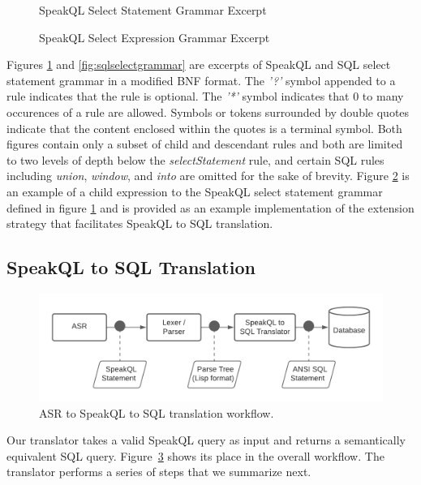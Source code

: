 \begin{figure}[H]
\selectStatementTable
\caption{SpeakQL Select Statement Grammar Excerpt}
\label{fig:speakqlselectgrammar}
\end{figure}

\begin{figure}[H]
\selectExpressionTable
\caption{SpeakQL Select Expression Grammar Excerpt}
\label{fig:selectexprgrammar}
\end{figure}

Figures \ref{fig:speakqlselectgrammar} and \ref{fig:sqlselectgrammar} are excerpts of SpeakQL and SQL select statement grammar in a modified BNF format. The \emph{'?'} symbol appended to a rule indicates that the rule is optional. The \emph{'*'} symbol indicates that 0 to many occurences of a rule are allowed. Symbols or tokens surrounded by double quotes indicate that the content enclosed within the quotes is a terminal symbol. Both figures contain only a subset of child and descendant rules and both are limited to two levels of depth below the \emph{selectStatement} rule, and certain SQL rules including \emph{union}, \emph{window}, and \emph{into} are omitted for the sake of brevity. Figure \ref{fig:selectexprgrammar} is an example of a child expression to the SpeakQL select statement grammar defined in figure \ref{fig:speakqlselectgrammar} and is provided as an example implementation of the extension strategy that facilitates SpeakQL to SQL translation.


\subsection{SpeakQL to SQL Translation}

\begin{figure}[h]
  \centering
  \includegraphics[width=0.8\linewidth]{figures/SpeakQL 2 to SQL Translation}
  \caption{ASR to SpeakQL to SQL translation workflow.}
  \label{fig:translationprocess}
\end{figure}

Our translator takes a valid SpeakQL query as input and returns a semantically equivalent SQL query. Figure~\ref{fig:translationprocess} shows its place in the overall workflow. 
The translator performs a series of steps that we summarize next. 

